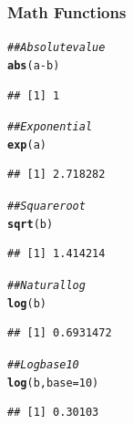 \documentclass{beamer}\usepackage[]{graphicx}\usepackage[]{xcolor}
\makeatletter
\newcommand{\hlnum}[1]{\textcolor[rgb]{0.686,0.059,0.569}{#1}}%
\newcommand{\hlcom}[1]{\textcolor[rgb]{0.678,0.584,0.686}{\textit{#1}}}%
\newcommand{\hlopt}[1]{\textcolor[rgb]{0,0,0}{#1}}%
\newcommand{\hlstd}[1]{\textcolor[rgb]{0.345,0.345,0.345}{#1}}%
\newcommand{\hlkwc}[1]{\textcolor[rgb]{0.333,0.667,0.333}{#1}}%
\newcommand{\hlkwd}[1]{\textcolor[rgb]{0.737,0.353,0.396}{\textbf{#1}}}%
\newenvironment{kframe}{%
 \def\at@end@of@kframe{}%
 \ifinner\ifhmode%
  \def\at@end@of@kframe{\end{minipage}}%
  \begin{minipage}{\columnwidth}%
 \fi\fi%
 \def\FrameCommand##1{\hskip\@totalleftmargin \hskip-\fboxsep
 \colorbox{shadecolor}{##1}\hskip-\fboxsep
     \hskip-\linewidth \hskip-\@totalleftmargin \hskip\columnwidth}%
 \MakeFramed {\advance\hsize-\width
   \@totalleftmargin\z@ \linewidth\hsize
   \@setminipage}}%
 {\par\unskip\endMakeFramed%
 \at@end@of@kframe}
\newenvironment{knitrout}{}{} %
\makeatother
\begin{document}
\begin{frame}[fragile]\frametitle{Math Functions}
\begin{knitrout}\footnotesize
{}\color{fgcolor}\begin{kframe}
\begin{alltt}
\hlcom{## Absolute value}
\hlkwd{abs}\hlstd{(a} \hlopt{-} \hlstd{b)}
\end{alltt}
\begin{verbatim}
## [1] 1
\end{verbatim}
\begin{alltt}
\hlcom{## Exponential}
\hlkwd{exp}\hlstd{(a)}
\end{alltt}
\begin{verbatim}
## [1] 2.718282
\end{verbatim}
\begin{alltt}
\hlcom{## Square root}
\hlkwd{sqrt}\hlstd{(b)}
\end{alltt}
\begin{verbatim}
## [1] 1.414214
\end{verbatim}
\begin{alltt}
\hlcom{## Natural log}
\hlkwd{log}\hlstd{(b)}
\end{alltt}
\begin{verbatim}
## [1] 0.6931472
\end{verbatim}
\begin{alltt}
\hlcom{## Log base 10}
\hlkwd{log}\hlstd{(b,} \hlkwc{base} \hlstd{=} \hlnum{10}\hlstd{)}
\end{alltt}
\begin{verbatim}
## [1] 0.30103
\end{verbatim}
\end{kframe}
\end{knitrout}
\end{frame}
\end{document}
